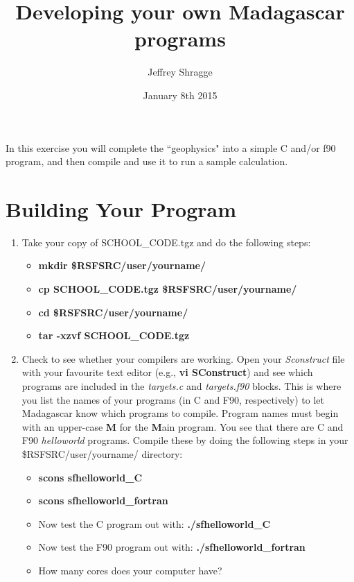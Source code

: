 \documentclass[18pt]{amsart}
\title{Developing your own Madagascar programs}
\author{Jeffrey Shragge}
\date{January 8th 2015}
\begin{document}
\maketitle

In this exercise you will complete the ``geophysics" into a simple C and/or f90 program, and then compile and use it to run a sample calculation.

\section{Building Your Program}
\begin{enumerate}
\item Take your copy of SCHOOL\_CODE.tgz and do the following steps:  
\begin{itemize}
\item {\bf mkdir \$RSFSRC/user/yourname/}
\item {\bf  cp SCHOOL\_CODE.tgz \$RSFSRC/user/yourname/ }
\item {\bf cd  \$RSFSRC/user/yourname/}
\item {\bf tar -xzvf SCHOOL\_CODE.tgz}\\
\end{itemize}

\item Check to see whether your compilers are working.  Open your {\it Sconstruct} file with your favourite text editor (e.g., {\bf vi SConstruct}) and see which programs are included in the {\it targets.c} and {\it targets.f90} blocks.  This is where you list the names of your programs (in C and F90, respectively) to let Madagascar know which programs to compile.  Program names must begin with an upper-case {\bf M} for the {\bf M}ain program.  You see that there are C and F90 {\it helloworld} programs.  Compile these by doing the following steps in your \$RSFSRC/user/yourname/ directory:
\begin{itemize}
\item {\bf scons sfhelloworld\_C} 
\item {\bf scons sfhelloworld\_fortran}
\item Now test the C program out with: {\bf ./sfhelloworld\_C}
\item Now test the F90 program out with: {\bf ./sfhelloworld\_fortran}
\item How many cores does your computer have?\\
\end{itemize}


\end{enumerate}
\end{document}
